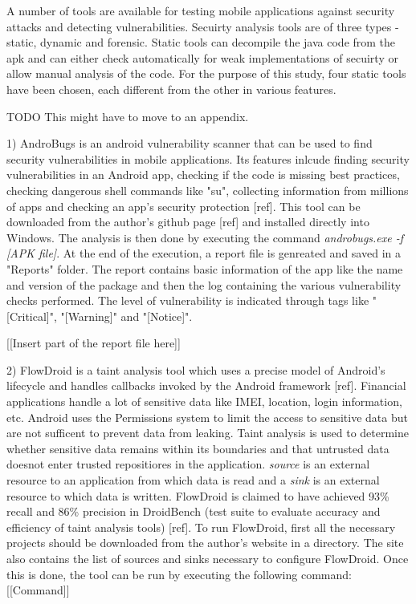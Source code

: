 \documentclass{mproj}
\begin{document}
A number of tools are available for testing mobile applications against security attacks and detecting vulnerabilities. Secuirty analysis tools are of three types - static, dynamic and forensic. Static tools can decompile the java code from the apk and can either check automatically for weak implementations of secuirty or allow manual analysis of the code. For the purpose of this study, four static tools have been chosen, each different from the other in various features. 

TODO This might have to move to an appendix.

1) AndroBugs is an android vulnerability scanner that can be used to find security vulnerabilities in mobile applications. Its features inlcude finding security vulnerabilities in an Android app, checking if the code is missing best practices, checking dangerous shell commands like "su", collecting information from millions of apps and checking an app’s security protection [ref]. This tool can be downloaded from the author's github page [ref] and installed directly into Windows. The analysis is then done by executing the command \textit{androbugs.exe -f [APK file]}. At the end of the execution, a report file is genreated and saved in a "Reports" folder. The report contains basic information of the app like the name and version of the package and then the log containing the various vulnerability checks performed. The level of vulnerability is indicated through tags like "[Critical]", "[Warning]" and "[Notice]".

[[Insert part of the report file here]]

2) FlowDroid is a taint analysis tool which uses a precise model of Android’s lifecycle and handles callbacks invoked by the Android framework [ref]. Financial applications handle a lot of sensitive data like IMEI, location, login information, etc. Android uses the Permissions system to limit the access to sensitive data but are not sufficent to prevent data from leaking. Taint analysis is used to determine whether sensitive data remains within its boundaries and that untrusted data doesnot enter trusted repositiores in the application. \textit{source} is an external resource to an application from which data is read and a \textit{sink} is  an external resource to which data is written. FlowDroid is claimed to have achieved 93\% recall and 86\% precision in DroidBench (test suite to evaluate accuracy and efficiency of taint analysis tools) [ref]. To run FlowDroid, first all the necessary projects should be downloaded from the author's website in a directory. The site also contains the list of sources and sinks necessary to configure FlowDroid. Once this is done, the tool can be run by executing the following command:
[[Command]]
\end{document}
